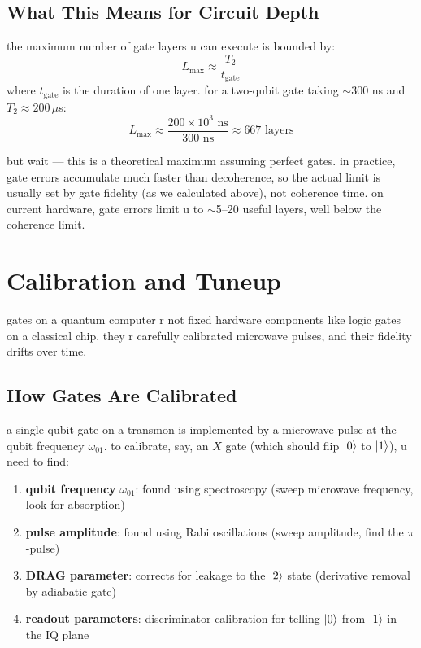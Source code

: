 \documentclass[11pt,a4paper]{article}
\theoremstyle{definition}
\theoremstyle{remark}
\begin{document}
\subsection{What This Means for Circuit Depth}

the maximum number of gate layers u can execute is bounded by:
\[
L_{\max} \approx \frac{T_2}{t_{\text{gate}}}
\]
where $t_{\text{gate}}$ is the duration of one layer. for a two-qubit gate taking $\sim$300 ns and $T_2 \approx 200 \, \mu$s:
\[
L_{\max} \approx \frac{200 \times 10^3 \text{ ns}}{300 \text{ ns}} \approx 667 \text{ layers}
\]

but wait --- this is a theoretical maximum assuming perfect gates. in practice, gate errors accumulate much faster than decoherence, so the actual limit is usually set by gate fidelity (as we calculated above), not coherence time. on current hardware, gate errors limit u to $\sim$5--20 useful layers, well below the coherence limit.

\section{Calibration and Tuneup}

gates on a quantum computer r not fixed hardware components like logic gates on a classical chip. they r carefully calibrated microwave pulses, and their fidelity drifts over time.

\subsection{How Gates Are Calibrated}

a single-qubit gate on a transmon is implemented by a microwave pulse at the qubit frequency $\omega_{01}$. to calibrate, say, an $X$ gate (which should flip $\ket{0}$ to $\ket{1}$), u need to find:

\begin{enumerate}[label=(\arabic*)]
    \item \textbf{qubit frequency} $\omega_{01}$: found using spectroscopy (sweep microwave frequency, look for absorption)
    \item \textbf{pulse amplitude}: found using Rabi oscillations (sweep amplitude, find the $\pi$-pulse)
    \item \textbf{DRAG parameter}: corrects for leakage to the $\ket{2}$ state (derivative removal by adiabatic gate)
    \item \textbf{readout parameters}: discriminator calibration for telling $\ket{0}$ from $\ket{1}$ in the IQ plane
\end{enumerate}
\end{document}
